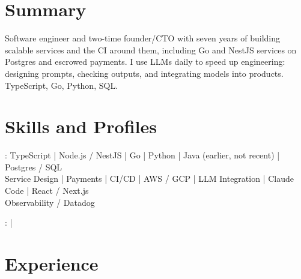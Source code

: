 \documentclass[print]{jack-resume}
\begin{document}
\pagecolor{darkmodeBackground}


\begin{minipage}[t][1cm][t]{.03\textwidth}
    \hfill
\end{minipage}

\section{Summary}
Software engineer and two-time founder/CTO with seven years of building scalable services and the CI around them, including Go and NestJS services on Postgres and escrowed payments. I use LLMs daily to speed up engineering: designing prompts, checking outputs, and integrating models into products. TypeScript, Go, Python, SQL.
\sectionsep

\section{Skills and Profiles}
:
TypeScript \hfill | \hfill
Node.js / NestJS \hfill | \hfill
Go \hfill | \hfill
Python \hfill | \hfill
Java (earlier, not recent) \hfill | \hfill
Postgres / SQL \\
\hspace{1.0cm} Service Design \hfill | \hfill
Payments \hfill | \hfill
CI/CD \hfill | \hfill
AWS / GCP \hfill | \hfill
LLM Integration \hfill | \hfill
Claude Code \hfill | \hfill
React / Next.js \\
\hspace{1.0cm} Observability / Datadog \\

\raggedright{
    :
      \href{https://www.linkedin.com/in/jack-sturtevant/}{ \ExternalLink} |
     \href{https://github.com/jacksturt}{ \ExternalLink}}

\section{Experience}
\end{document}
